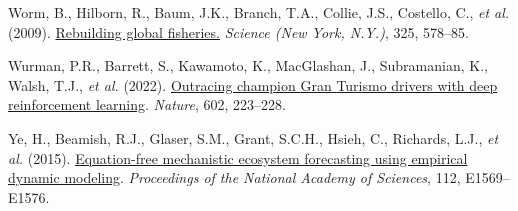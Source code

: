 \documentclass[3p]{elsarticle} %
\newlength{\cslhangindent}
\newenvironment{CSLReferences}[2] %
 {%
  \setlength{\parindent}{0pt}
  \ifodd #1 \everypar{\setlength{\hangindent}{\cslhangindent}}\ignorespaces\fi
  \ifnum #2 > 0
  \setlength{\parskip}{#2\baselineskip}
  \fi
 }%
 {}
\begin{document}
\begin{CSLReferences}{1}{0}
\leavevmode{}%
Worm, B., Hilborn, R., Baum, J.K., Branch, T.A., Collie, J.S., Costello,
C., \emph{et al.} (2009).
\href{https://doi.org/10.1126/science.1173146}{{Rebuilding global
fisheries.}} \emph{Science (New York, N.Y.)}, 325, 578--85.

\leavevmode{}%
Wurman, P.R., Barrett, S., Kawamoto, K., MacGlashan, J., Subramanian,
K., Walsh, T.J., \emph{et al.} (2022).
\href{https://doi.org/10.1038/s41586-021-04357-7}{Outracing champion
{Gran} {Turismo} drivers with deep reinforcement learning}.
\emph{Nature}, 602, 223--228.

\leavevmode{}%
Ye, H., Beamish, R.J., Glaser, S.M., Grant, S.C.H., Hsieh, C., Richards,
L.J., \emph{et al.} (2015).
\href{https://doi.org/10.1073/pnas.1417063112}{Equation-free mechanistic
ecosystem forecasting using empirical dynamic modeling}.
\emph{Proceedings of the National Academy of Sciences}, 112,
E1569--E1576.

\end{CSLReferences}
\end{document}

